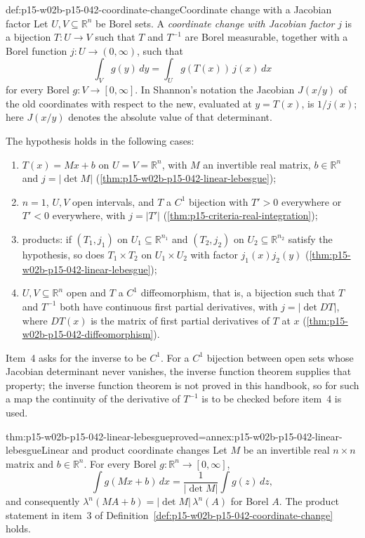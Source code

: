 \begin{hbdefinition}{def:p15-w02b-p15-042-coordinate-change}{Coordinate change with a Jacobian factor}
Let \(U,V\subseteq\mathbb R^n\) be Borel sets. A \emph{coordinate change with
Jacobian factor} \(j\) is a bijection \(T:U\to V\) such that \(T\) and
\(T^{-1}\) are Borel measurable, together with a Borel function
\(j:U\to(0,\infty)\), such that
\[
 \int_V g(y)\,dy=\int_U g(T(x))\,j(x)\,dx
\]
for every Borel \(g:V\to[0,\infty]\). In Shannon's notation the Jacobian
\(J(x/y)\) of the old coordinates with respect to the new, evaluated at
\(y=T(x)\), is \(1/j(x)\); here \(J(x/y)\) denotes the absolute value of
that determinant.

The hypothesis holds in the following cases:
\begin{enumerate}
\item \(T(x)=Mx+b\) on \(U=V=\mathbb R^n\), with \(M\) an invertible real
      matrix, \(b\in\mathbb R^n\) and \(j=|\det M|\)
      (\cref{thm:p15-w02b-p15-042-linear-lebesgue});
\item \(n=1\), \(U,V\) open intervals, and \(T\) a \(C^1\) bijection with
      \(T'>0\) everywhere or \(T'<0\) everywhere, with \(j=|T'|\)
      (\cref{thm:p15-criteria-real-integration});
\item products: if \((T_1,j_1)\) on \(U_1\subseteq\mathbb R^{n_1}\) and
      \((T_2,j_2)\) on \(U_2\subseteq\mathbb R^{n_2}\) satisfy the hypothesis,
      so does \(T_1\times T_2\) on \(U_1\times U_2\) with factor
      \(j_1(x)j_2(y)\) (\cref{thm:p15-w02b-p15-042-linear-lebesgue});
\item \(U,V\subseteq\mathbb R^n\) open and \(T\) a \(C^1\) diffeomorphism,
      that is, a bijection such that \(T\) and \(T^{-1}\) both have
      continuous first partial derivatives, with \(j=|\det DT|\), where
      \(DT(x)\) is the matrix of first partial derivatives of \(T\) at \(x\)
      (\cref{thm:p15-w02b-p15-042-diffeomorphism}).
\end{enumerate}
Item~4 asks for the inverse to be \(C^1\). For a \(C^1\) bijection between
open sets whose Jacobian determinant never vanishes, the inverse function
theorem supplies that property; the inverse function theorem is not proved
in this handbook, so for such a map the continuity of the derivative of
\(T^{-1}\) is to be checked before item~4 is used.
\end{hbdefinition}

\begin{hblemma}{thm:p15-w02b-p15-042-linear-lebesgue}{proved=annex:p15-w02b-p15-042-linear-lebesgue}{Linear and product coordinate changes}
Let \(M\) be an invertible real \(n\times n\) matrix and \(b\in\mathbb R^n\).
For every Borel \(g:\mathbb R^n\to[0,\infty]\),
\[
 \int g(Mx+b)\,dx=\frac1{|\det M|}\int g(z)\,dz ,
\]
and consequently \(\lambda^n(MA+b)=|\det M|\,\lambda^n(A)\) for Borel \(A\).
The product statement in item~3 of
Definition~\ref{def:p15-w02b-p15-042-coordinate-change} holds.
\end{hblemma}

